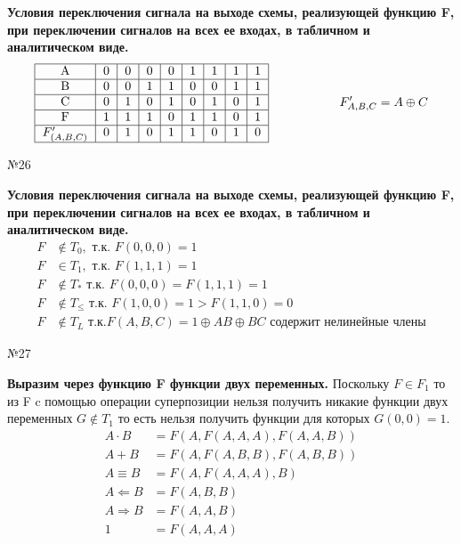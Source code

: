 \documentclass[]{article}
\begin{document}
	\textbf{Условия переключения сигнала на выходе схемы, реализующей функцию F, при переключении сигналов на всех ее входах, в табличном и аналитическом виде.}
	\[
	\begin{aligned}
	\begin{tabular}{|c|c|c|c|c|c|c|c|c|}
	\hline
	A              & 0 & 0 & 0 & 0 & 1 & 1 & 1 & 1 \\ \hline
	B              & 0 & 0 & 1 & 1 & 0 & 0 & 1 & 1 \\ \hline
	C              & 0 & 1 & 0 & 1 & 0 & 1 & 0 & 1 \\ \hline
	F              & 1 & 1 & 1 & 0 & 1 & 1 & 0 & 1 \\ \hline
	$F'_{(A,B,C)}$ & 0 & 1 & 0 & 1 & 1 & 0 & 1 & 0 \\ \hline
	\end{tabular}
	\begin{aligned}
	\hspace{2cm}
	F'_{A,B,C}&=A\oplus C\\
	\end{aligned}
	\end{aligned}
	\]
	\begin{center}\begin{large}{№26}\end{large}\end{center}
	\textbf{Условия переключения сигнала на выходе схемы, реализующей функцию F, при переключении сигналов на всех ее входах, в табличном и аналитическом виде.}
	\[
	\begin{aligned}
	F&\notin T_0,\text{ т.к. } F(0,0,0)=1\\
	F&\in T_1,\text{ т.к. } F(1,1,1)=1\\
	F&\notin T_*\text{ т.к. } F(0,0,0)=F(1,1,1)=1\\
	F&\notin T_{\le} \text{ т.к. } F(1,0,0)=1>F(1,1,0)=0\\
	F&\notin T_{L} \text{ т.к.} F(A,B,C)=1\oplus AB\oplus BC \text{ содержит нелинейные члены}
	\end{aligned}
	\]
	\begin{center}\begin{large}{№27}\end{large}\end{center}
	\textbf{Выразим через функцию F функции двух переменных.}
	Поскольку $F\in F_1$ то из F c помощью операции суперпозиции нельзя получить никакие функции двух переменных $G\notin T_1$ то есть нельзя получить функции для которых $G(0,0)=1$.
	\[
	\begin{aligned}
	A\cdot B &= F(A,F(A,A,A),F(A,A,B))\\
	A+B&=F(A,F(A,B,B),F(A,B,B))\\
	A\equiv B &=F(A,F(A,A,A),B)\\
	A\Leftarrow B &= F(A,B,B)\\
	A\Rightarrow B&=F(A,A,B)\\
	1&=F(A,A,A)
	\end{aligned}
	\]
\end{document}
